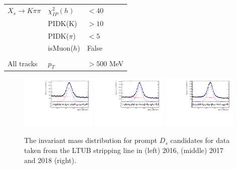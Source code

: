 \begin{table}[h]
\begin{tabular}{l l l}
\\
$X_s \to K \pi \pi$  &  $\chi^{2}_{IP}(h)$ &  $< 40$ \\
& PIDK(K) & $> 10$ \\
& PIDK($\pi$) & $< 5$ \\
& isMuon($h$) & False \\
\\
All tracks  & $p_T$ & $> 500$ MeV \\

\hline
\hline
\end{tabular}
\label{table:fakeBsel}
\end{table}

\begin{figure}[h]
\centering
\includegraphics[height=!,width=0.32\textwidth]{figs/Resolution/Ds_M_pull_16.pdf}
\includegraphics[height=!,width=0.32\textwidth]{figs/Resolution/Ds_M_pull_17.pdf}
\includegraphics[height=!,width=0.32\textwidth]{figs/Resolution/Ds_M_pull_18.pdf}
\caption{The invariant mass distribution for prompt $D_s$ candidates for data taken from the LTUB stripping line in (left) 2016, (middle) 2017 and 2018 (right). }
\label{fig:ResoFit_Ds}
\end{figure}

